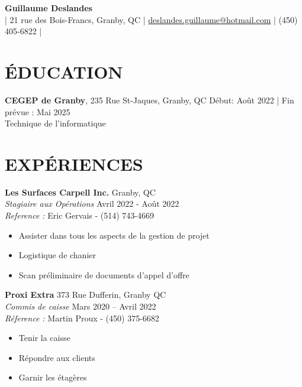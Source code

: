 \documentclass[a4paper,9pt]{extarticle}
\begin{document}
\pagestyle{empty}

\begin{center}
\textbf{\Large Guillaume Deslandes}\\[2pt] %
| 21 rue des Bois-Francs, Granby, QC | \href{mailto:deslandes.guillaume@hotmail.com}{deslandes.guillaume@hotmail.com} | (450) 405-6822 | 
\end{center}

\section*{ÉDUCATION}
\noindent
\textbf{CEGEP de Granby}, 235 Rue St-Jaques, Granby, QC \hfill Début: Août 2022 | Fin prévue :  Mai 2025\\ 
Technique de l'informatique \hfill \\ 


\section*{EXPÉRIENCES}
\noindent
\textbf{Les Surfaces Carpell Inc.} \hfill Granby, QC\\
\textit{Stagiaire aux Opérations} \hfill Avril 2022 - Août 2022 \\ 
\textit{Reference : } \hfill Eric Gervais - (514) 743-4669

\begin{itemize}
    \item Assister dans tous les aspects de la gestion de projet
    \item Logistique de chanier
    \item Scan préliminaire de documents d'appel d'offre
\end{itemize}

\noindent
\textbf{Proxi Extra} \hfill 373 Rue Dufferin, Granby QC\\ 
\textit{Commis de caisse} \hfill Mars 2020 – Avril 2022 \\
\textit{Réference : } \hfill Martin Proux - (450) 375-6682 

\begin{itemize}
    \item Tenir la caisse
    \item Répondre aux clients
    \item Garnir les étagères
\end{itemize}

\end{document}
